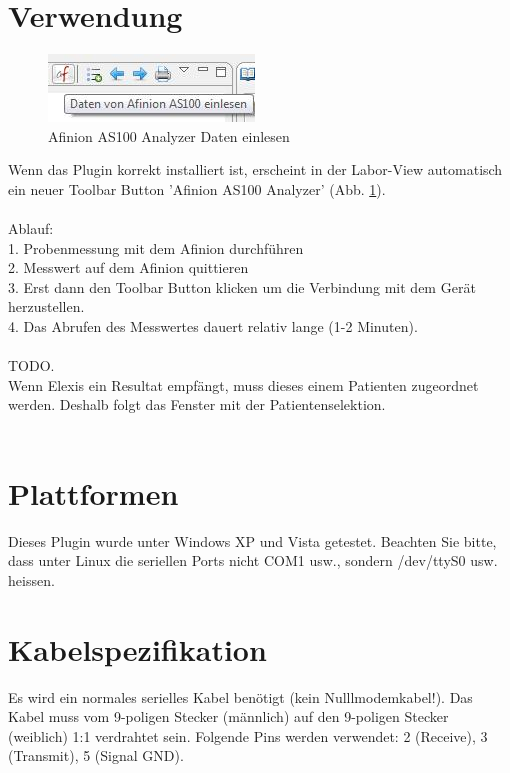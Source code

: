 \documentclass[a4paper]{scrartcl}
\begin{document}
\section{Verwendung}
\begin{figure}[h]
    \includegraphics{toolbarbutton}
    \caption{Afinion AS100 Analyzer Daten einlesen}
    \label{fig:toolbarbutton}
\end{figure}
Wenn das Plugin korrekt installiert ist, erscheint in der Labor-View automatisch ein neuer Toolbar Button 'Afinion AS100 Analyzer' (Abb. \ref{fig:toolbarbutton}).\\
\\
Ablauf: \\
1. Probenmessung mit dem Afinion durchf\"uhren\\
2. Messwert auf dem Afinion quittieren\\
3. Erst dann den Toolbar Button klicken um die Verbindung mit dem Ger\"at herzustellen.\\
4. Das Abrufen des Messwertes dauert relativ lange (1-2 Minuten).\\
\\
TODO.\\
Wenn Elexis ein Resultat empf\"angt, muss dieses einem Patienten zugeordnet werden. Deshalb folgt das Fenster mit der Patientenselektion.\\
\\
\section{Plattformen}
Dieses Plugin wurde unter Windows XP und Vista getestet. Beachten Sie bitte, dass unter Linux die seriellen Ports nicht COM1 usw., sondern /dev/ttyS0 usw. heissen.

\section{Kabelspezifikation}
Es wird ein normales serielles Kabel ben\"otigt (kein Nulllmodemkabel!). Das Kabel muss vom 9-poligen Stecker (m\"annlich) auf den 9-poligen Stecker (weiblich) 1:1 verdrahtet sein. Folgende Pins werden verwendet: 2 (Receive), 3 (Transmit), 5 (Signal GND).\\
\end{document}
